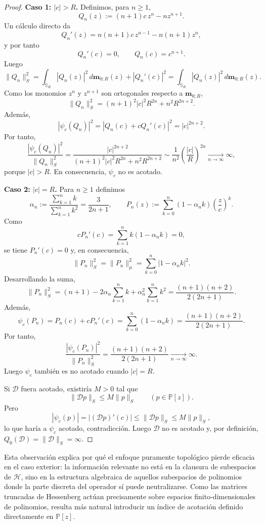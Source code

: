 \documentclass[12pt,a4paper]{article}
\theoremstyle{definition}
\theoremstyle{remark}
\newcommand{\Poly}{\mathbb{P}[z]}
\newcommand{\D}{\mathcal{D}}
\begin{document}
\begin{proof}
  \textbf{Caso 1: $|c|>R$.}
  Definimos, para $n\ge 1$,
  \[
    Q_n(z):=(n+1)c\,z^n-nz^{n+1}.
  \]
  Un cálculo directo da
  \[
    Q_n'(z)=n(n+1)c\,z^{n-1}-n(n+1)z^n,
  \]
  y por tanto
  \[
    Q_n'(c)=0,
    \qquad
    Q_n(c)=c^{n+1}.
  \]
  Luego
  \[
    \|Q_n\|_S^2
    =
    \int_{\mathbb{S}_R}|Q_n(z)|^2\,d\mathbf m_{0;R}(z)
    +
    |Q_n'(c)|^2
    =
    \int_{\mathbb{S}_R}|Q_n(z)|^2\,d\mathbf m_{0;R}(z).
  \]
  Como los monomios $z^n$ y $z^{n+1}$ son ortogonales respecto a $\mathbf m_{0;R}$,
  \[
    \|Q_n\|_S^2
    =
    (n+1)^2|c|^2R^{2n}+n^2R^{2n+2}.
  \]
  Además,
  \[
    |\psi_c(Q_n)|^2
    =
    |Q_n(c)+cQ_n'(c)|^2
    =
    |c|^{2n+2}.
  \]
  Por tanto,
  \[
    \frac{|\psi_c(Q_n)|^2}{\|Q_n\|_S^2}
    =
    \frac{|c|^{2n+2}}{(n+1)^2|c|^2R^{2n}+n^2R^{2n+2}}
    \sim
    \frac{1}{n^2}\left(\frac{|c|}{R}\right)^{2n}
    \xrightarrow[n\to\infty]{}\infty,
  \]
  porque $|c|>R$. En consecuencia, $\psi_c$ no es acotado.

  \textbf{Caso 2: $|c|=R$.}
  Para $n\ge1$ definimos
  \[
    \alpha_n:=\frac{\sum_{k=1}^{n}k}{\sum_{k=1}^{n}k^2}=\frac{3}{2n+1},
    \qquad
    P_n(z):=\sum_{k=0}^{n}(1-\alpha_n k)\left(\frac{z}{c}\right)^k.
  \]
  Como
  \[
    cP_n'(c)=\sum_{k=1}^{n}k(1-\alpha_n k)=0,
  \]
  se tiene $P_n'(c)=0$ y, en consecuencia,
  \[
    \|P_n\|_S^2=\|P_n\|_{\mu}^2=
    \sum_{k=0}^{n}|1-\alpha_n k|^2.
  \]
  Desarrollando la suma,
  \[
    \|P_n\|_S^2
    =(n+1)-2\alpha_n\sum_{k=1}^{n}k+\alpha_n^2\sum_{k=1}^{n}k^2
    =\frac{(n+1)(n+2)}{2(2n+1)}.
  \]
  Además,
  \[
    \psi_c(P_n)=P_n(c)+cP_n'(c)=\sum_{k=0}^{n}(1-\alpha_n k)
    =\frac{(n+1)(n+2)}{2(2n+1)}.
  \]
  Por tanto,
  \[
    \frac{|\psi_c(P_n)|^2}{\|P_n\|_S^2}
    =
    \frac{(n+1)(n+2)}{2(2n+1)}
    \xrightarrow[n\to\infty]{}\infty.
  \]
  Luego $\psi_c$ también es no acotado cuando $|c|=R$.

  Si $\D$ fuera acotado, existiría $M>0$ tal que
  \[
    \|\D p\|_S\le M\|p\|_S
    \qquad (p\in\Poly).
  \]
  Pero
  \[
    |\psi_c(p)|
    =
    |(\D p)'(c)|
    \le
    \|\D p\|_S
    \le
    M\|p\|_S,
  \]
  lo que haría a $\psi_c$ acotado, contradicción. Luego $\D$ no es acotado y, por definición, $Q_0(\D)=\|\D\|_S=\infty$.
\end{proof}

Esta observación explica por qué el enfoque puramente topológico pierde eficacia en el caso exterior: la información relevante no está en la clausura de subespacios de $\mathcal{H}$, sino en la estructura algebraica de aquellos subespacios de polinomios donde la parte discreta del operador sí puede neutralizarse. Como las matrices truncadas de Hessenberg actúan precisamente sobre espacios finito-dimensionales de polinomios, resulta más natural introducir un índice de acotación definido directamente en $\Poly$.
\end{document}
